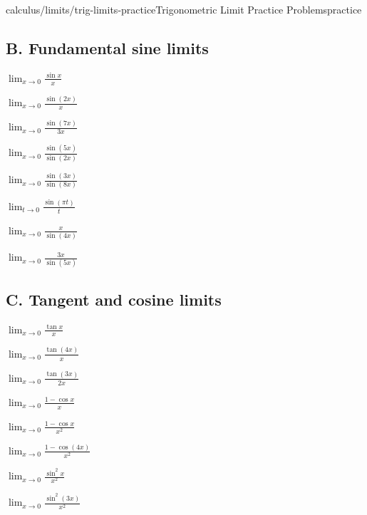 \begin{webpage}{calculus/limits/trig-limits-practice}{Trigonometric Limit Practice Problems}{practice}
\subsection*{B. Fundamental sine limits}
\begin{bgexercises}[label=\textbf{3.\arabic*},resume]
  \item \(\displaystyle\lim_{x\to0}\frac{\sin x}{x}\)
  \item \(\displaystyle\lim_{x\to0}\frac{\sin(2x)}{x}\)
  \item \(\displaystyle\lim_{x\to0}\frac{\sin(7x)}{3x}\)
  \item \(\displaystyle\lim_{x\to0}\frac{\sin(5x)}{\sin(2x)}\)
  \item \(\displaystyle\lim_{x\to0}\frac{\sin(3x)}{\sin(8x)}\)
  \item \(\displaystyle\lim_{t\to0}\frac{\sin(\pi t)}{t}\)
  \item \(\displaystyle\lim_{x\to0}\frac{x}{\sin(4x)}\)
  \item \(\displaystyle\lim_{x\to0}\frac{3x}{\sin(5x)}\)
\end{bgexercises}

\subsection*{C. Tangent and cosine limits}
\begin{bgexercises}[label=\textbf{3.\arabic*},resume]
  \item \(\displaystyle\lim_{x\to0}\frac{\tan x}{x}\)
  \item \(\displaystyle\lim_{x\to0}\frac{\tan(4x)}{x}\)
  \item \(\displaystyle\lim_{x\to0}\frac{\tan(3x)}{2x}\)
  \item \(\displaystyle\lim_{x\to0}\frac{1-\cos x}{x}\)
  \item \(\displaystyle\lim_{x\to0}\frac{1-\cos x}{x^2}\)
  \item \(\displaystyle\lim_{x\to0}\frac{1-\cos(4x)}{x^2}\)
  \item \(\displaystyle\lim_{x\to0}\frac{\sin^2x}{x^2}\)
  \item \(\displaystyle\lim_{x\to0}\frac{\sin^2(3x)}{x^2}\)
\end{bgexercises}


\end{webpage}
